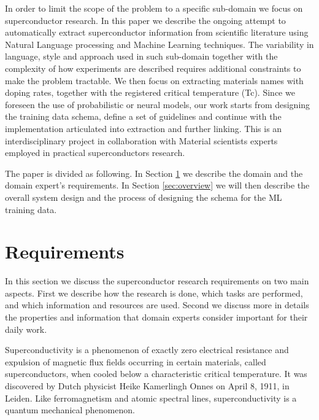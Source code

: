 \documentclass{article}
\begin{document}
In order to limit the scope of the problem to a specific sub-domain we focus on superconductor research. In this paper we describe the ongoing attempt to automatically extract superconductor information from scientific literature using Natural Language processing and Machine Learning techniques. 
The variability in language, style and approach used in such sub-domain together with the complexity of how experiments are described requires additional constraints to make the problem tractable. 
We then focus on extracting materials names with doping rates, together with the registered critical temperature (Tc). Since we foreseen the use of probabilistic or neural models, our work starts from designing the training data schema, define a set of guidelines and continue with the implementation articulated into extraction and further linking. 
This is an interdisciplinary project in collaboration with Material scientists experts employed in practical superconductors research. 

The paper is divided as following. In Section \ref{sec:requirements} we describe the domain and the domain expert's requirements. In Section \ref{sec:overview} we will then describe the overall system design and the process of designing the schema for the ML training data. 



\section{Requirements}
\label{sec:requirements}

In this section we discuss the superconductor research requirements on two main aspects. First we describe how the research is done, which tasks are performed, and which information and resources are used. Second we discuss more in details the properties and information that domain experts consider important for their daily work. 

Superconductivity is a phenomenon of exactly zero electrical resistance and expulsion of magnetic flux fields occurring in certain materials, called superconductors, when cooled below a characteristic critical temperature. It was discovered by Dutch physicist Heike Kamerlingh Onnes on April 8, 1911, in Leiden. Like ferromagnetism and atomic spectral lines, superconductivity is a quantum mechanical phenomenon.
\end{document}
